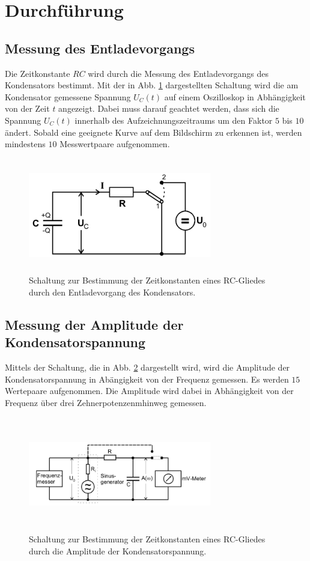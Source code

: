 \section{Durchführung}
\label{sec:Durchführung}

\subsection{Messung des Entladevorgangs}
Die Zeitkonstante $RC$ wird durch die Messung des Entladevorgangs des Kondensators bestimmt. 
Mit der in Abb. \ref{fig:4a} dargestellten Schaltung wird die am Kondensator gemessene Spannung $U_{C}(t)$ auf einem
Oszilloskop in Abhängigkeit von der Zeit $t$ angezeigt. Dabei muss darauf geachtet werden, dass sich die Spannung 
$U_{C}(t)$ innerhalb des Aufzeichnungszeitraums um den Faktor $5$ bis $10$ ändert. Sobald eine geeignete Kurve auf dem 
Bildschirm zu erkennen ist, werden mindestens $10$ Messwertpaare aufgenommen.
\begin{figure}
  \centering
  \includegraphics[width= 8cm, height=5cm]{build/4a.png}
  \caption{Schaltung zur Bestimmung der Zeitkonstanten eines RC-Gliedes durch den Entladevorgang des Kondensators.}
  \label{fig:4a}
\end{figure}

\subsection{Messung der Amplitude der Kondensatorspannung}
Mittels der Schaltung, die in Abb. \ref{fig:4b} dargestellt wird, wird die Amplitude der Kondensatorspannung in 
Abängigkeit von der Frequenz gemessen. Es werden $15$ Wertepaare aufgenommen.
Die Amplitude wird dabei in Abhängigkeit von der Frequenz über drei Zehnerpotenzenmhinweg gemessen.
\begin{figure}
  \centering
  \includegraphics[width= 8cm, height=5cm]{build/4b.png}
  \caption{Schaltung zur Bestimmung der Zeitkonstanten eines RC-Gliedes durch die Amplitude der Kondensatorspannung.}
  \label{fig:4b}
\end{figure}

